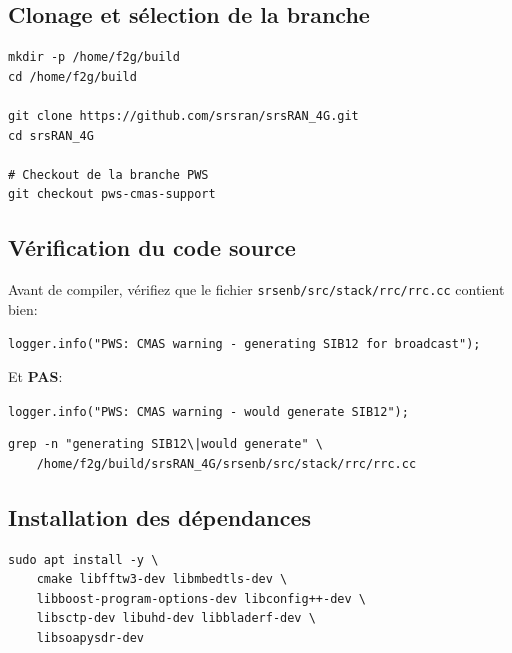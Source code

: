 \documentclass[11pt,a4paper]{article}
\newcommand{\file}[1]{\texttt{\color{successgreen}#1}}
\begin{document}
\subsection{Clonage et sélection de la branche}

\begin{cmdbox}
\begin{lstlisting}[style=bashstyle]
mkdir -p /home/f2g/build
cd /home/f2g/build

git clone https://github.com/srsran/srsRAN_4G.git
cd srsRAN_4G

# Checkout de la branche PWS
git checkout pws-cmas-support
\end{lstlisting}
\end{cmdbox}

\subsection{Vérification du code source}

\begin{warnbox}
Avant de compiler, vérifiez que le fichier \file{srsenb/src/stack/rrc/rrc.cc} contient bien:
\begin{center}
\texttt{logger.info("PWS: CMAS warning - generating SIB12 for broadcast");}
\end{center}
Et \textbf{PAS}:
\begin{center}
\texttt{logger.info("PWS: CMAS warning - would generate SIB12");}
\end{center}
\end{warnbox}

\begin{cmdbox}
\begin{lstlisting}[style=bashstyle]
grep -n "generating SIB12\|would generate" \
    /home/f2g/build/srsRAN_4G/srsenb/src/stack/rrc/rrc.cc
\end{lstlisting}
\end{cmdbox}

\subsection{Installation des dépendances}

\begin{cmdbox}
\begin{lstlisting}[style=bashstyle]
sudo apt install -y \
    cmake libfftw3-dev libmbedtls-dev \
    libboost-program-options-dev libconfig++-dev \
    libsctp-dev libuhd-dev libbladerf-dev \
    libsoapysdr-dev
\end{lstlisting}
\end{cmdbox}
\end{document}
